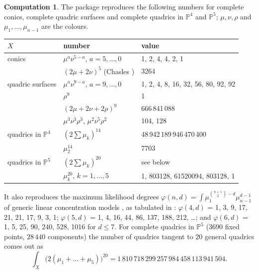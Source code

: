 \documentclass[11pt]{amsart}
\theoremstyle{definition}
\newtheorem{computation}[theorem]{Computation}
\theoremstyle{remark}
\newcommand{\PP}{\mathbb{P}}
\begin{document}
\begin{computation}\label{comp:characteristic}
The package reproduces the following numbers for complete conics,
complete quadric surfaces and complete quadrics in $\PP^4$ and $\PP^5$;
$\mu,\nu,\rho$ and $\mu_1,\dots,\mu_{n-1}$ are the colours.

\smallskip
\begin{center}
\small
\begin{tabular}{p{}p{}p{}}
\toprule
$X$ & number & value\\
\midrule
conics & $\mu^a\nu^{5-a}$, $a=5,\dots,0$ & 1, 2, 4, 4, 2, 1\\
 & $(2\mu+2\nu)^5$ (Chasles \cite{Chasles}) & 3264\\
quadric surfaces & $\mu^a\nu^{9-a}$, $a=9,\dots,0$ \cite{Schubert} & 1, 2, 4, 8, 16, 32, 56, 80, 92, 92\\
 & $\rho^9$ & 1\\
 & $(2\mu+2\nu+2\rho)^9$ & 666\,841\,088\\
 & $\mu^3\nu^3\rho^3$, $\mu^2\nu^5\rho^2$ \cite{BFS} & 104, 128\\
quadrics in $\PP^4$ & $(2\sum\mu_k)^{14}$ \cite{Sturmfels3264} & 48\,942\,189\,946\,470\,400\\
 & $\mu_2^{14}$ & 7703\\
quadrics in $\PP^5$ & $(2\sum\mu_k)^{20}$ & see below\\
 & $\mu_k^{20}$, $k=1,\dots,5$ & 1, 803128, 61520094, 803128, 1\\
\bottomrule
\end{tabular}
\end{center}
\smallskip

\noindent It also reproduces the maximum likelihood degrees
$\varphi(n,d)=\int\mu_1^{\binom{n+1}2-d}\mu_{n-1}^{d-1}$ of generic linear
concentration models \cite[Prop.~3.5 of the arXiv version]{MMMSV}, as tabulated in
\cite[\S2.2]{SturmfelsUhler}: $\varphi(4,d)$ = 1, 3, 9, 17, 21, 21, 17, 9, 3, 1;
$\varphi(5,d)$ = 1, 4, 16, 44, 86, 137, 188, 212, \dots; and
$\varphi(6,d)$ = 1, 5, 25, 90, 240, 528, 1016 for $d\le7$. For complete
quadrics in $\PP^5$ ($3690$ fixed points, $28\,440$ components) the number of
quadrics tangent to $20$ general quadrics comes out as
\[
\int_X \bigl(2(\mu_1+\dots+\mu_5)\bigr)^{20} = 1\,810\,718\,299\,257\,984\,458\,113\,941\,504 .
\]
\end{computation}
\end{document}

